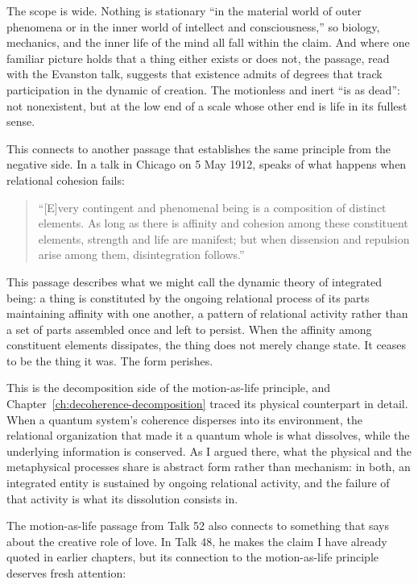 The scope is wide. Nothing is stationary ``in the material world of outer phenomena or in the inner world of intellect and consciousness,'' so biology, mechanics, and the inner life of the mind all fall within the claim. And where one familiar picture holds that a thing either exists or does not, the passage, read with the Evanston talk, suggests that existence admits of degrees that track participation in the dynamic of creation. The motionless and inert ``is as dead'': not nonexistent, but at the low end of a scale whose other end is life in its fullest sense.

This connects to another passage that establishes the same principle from the negative side. In a talk in Chicago on 5 May 1912, \AbdulBaha speaks of what happens when relational cohesion fails:

\begin{quote}
``[E]very contingent and phenomenal being is a composition of distinct elements. As long as there is affinity and cohesion among these constituent elements, strength and life are manifest; but when dissension and repulsion arise among them, disintegration follows.'' \citep[Talk 41]{PUP}
\end{quote}

This passage describes what we might call the dynamic theory of integrated being: a thing is constituted by the ongoing relational process of its parts maintaining affinity with one another, a pattern of relational activity rather than a set of parts assembled once and left to persist. When the affinity among constituent elements dissipates, the thing does not merely change state. It ceases to be the thing it was. The form perishes.

This is the decomposition side of the motion-as-life principle, and Chapter~\ref{ch:decoherence-decomposition} traced its physical counterpart in detail. When a quantum system's coherence disperses into its environment, the relational organization that made it a quantum whole is what dissolves, while the underlying information is conserved. As I argued there, what the physical and the metaphysical processes share is abstract form rather than mechanism: in both, an integrated entity is sustained by ongoing relational activity, and the failure of that activity is what its dissolution consists in.

The motion-as-life passage from Talk 52 also connects to something that \AbdulBaha says about the creative role of love. In Talk 48, he makes the claim I have already quoted in earlier chapters, but its connection to the motion-as-life principle deserves fresh attention:

